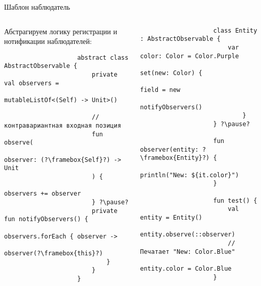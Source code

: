 \documentclass[handout,aspectratio=169,usenames,dvipsnames]{beamer}
\begin{document}
    \begin{frame}[fragile]{Шаблон наблюдатель}
        \begin{columns}
            \begin{column}{0.48\textwidth}
                Абстрагируем логику регистрации и нотификации наблюдателей:
                \begin{verbatim}
                    abstract class AbstractObservable {
                        private val observers =
                            mutableListOf<(Self) -> Unit>()

                        // контравариантная входная позиция
                        fun observe(
                            observer: (?\framebox{Self}?) -> Unit
                        ) {
                            observers += observer
                        } ?\pause?
                        private fun notifyObservers() {
                            observers.forEach { observer ->
                                observer(?\framebox{this}?)
                            }
                        }
                    }
                \end{verbatim}
            \end{column}
            \pause
            \begin{column}{0.49\textwidth}
                \vspace{-0.5em}
                \begin{verbatim}
                    class Entity : AbstractObservable {
                        var color: Color = Color.Purple
                            set(new: Color) {
                                field = new
                                notifyObservers()
                            }
                    } ?\pause?

                    fun observer(entity: ?\framebox{Entity}?) {
                        println("New: ${it.color}")
                    }

                    fun test() {
                        val entity = Entity()
                        entity.observe(::observer)
                        // Печатает "New: Color.Blue"
                        entity.color = Color.Blue
                    }
                \end{verbatim}
            \end{column}
        \end{columns}
    \end{frame}
\end{document}
